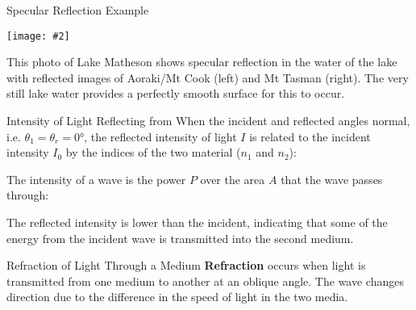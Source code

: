 \documentclass[12pt,compress,aspectratio=169]{beamer}
\newcommand{\pic}[2]{\texttt{[image: \#2]}}
\newcommand{\eq}[2]{\vspace{#1}{\LARGE\begin{displaymath}#2\end{displaymath}}}
\begin{document}
\begin{frame}{Specular Reflection Example}
  \begin{center}
    \pic{.55}{graphics/Lake-reflection.jpg}
  \end{center}
  This photo of Lake Matheson shows specular reflection in the water of the
  lake with reflected images of Aoraki/Mt Cook (left) and Mt Tasman (right).
  The very still lake water provides a perfectly smooth surface for this to
  occur.
\end{frame}


\begin{frame}{Intensity of Light Reflecting from}
  When the incident and reflected angles normal, i.e.
  $\theta_1=\theta_r=\ang{0}$, the reflected intensity of light $I$ is related
  to the incident intensity $I_0$ by the indices of the two material ($n_1$ and
  $n_2$):

  \eq{-.3in}{
    I=\left(\frac{n_1-n_2}{n_1+n_2}\right)^2 I_0
  }
  
  The intensity of a wave is the power $P$ over the area $A$ that the wave
  passes through:

  \eq{-.3in}{
    I=\frac{P}{A}
  }

  The reflected intensity is lower than the incident, indicating that some of
  the energy from the incident wave is transmitted into the second medium.
\end{frame}



\begin{frame}{Refraction of Light Through a Medium}
  \textbf{Refraction} occurs when light is transmitted from one medium to
  another at an oblique angle. The wave changes direction due to the difference
  in the speed of light in the two media.
  \begin{center}
  \end{center}
\end{frame}
\end{document}
